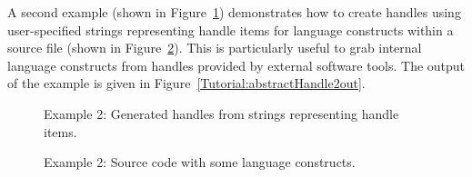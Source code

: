 \clearpage
A second example (shown in Figure~\ref{Tutorial:abstractHandle2})
demonstrates how to create handles using user-specified strings
representing handle items for language constructs within a source file
(shown in Figure~\ref{Tutorial:abstractHandle2input}). 
This is particularly useful to grab internal language constructs from handles provided by external software tools. 
The output of the example is given in Figure~\ref{Tutorial:abstractHandle2out}.

\begin{figure}[!h]
{\indent
{\mySmallFontSize
\begin{latexonly}
  
\end{latexonly}

\begin{htmlonly}
   
\end{htmlonly}

}
}
\caption{Example 2: Generated handles from strings representing handle items.}
\label{Tutorial:abstractHandle2}
\end{figure}

\begin{figure}[!h]
{\indent
{\mySmallFontSize
\begin{latexonly}
  
\end{latexonly}

\begin{htmlonly}
   
\end{htmlonly}

}
}
\caption{Example 2: Source code with some language constructs.}
\label{Tutorial:abstractHandle2input}
\end{figure}


